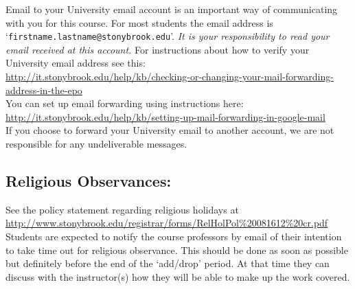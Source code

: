 \documentclass[11pt]{article}
\begin{document}
\noindent Email to your University email account is an important way
of communicating with you for this course.  For most students the
email address is `{\tt firstname.lastname@stonybrook.edu}'.
{\em It is your responsibility to read your email received at this
  account.}  For instructions about how to verify your University
email address see this: \\[0.25em]
\url{http://it.stonybrook.edu/help/kb/checking-or-changing-your-mail-forwarding-address-in-the-epo}
\\[0.25em]
%
You can set up email forwarding using instructions here: \\[0.25em]
\url{http://it.stonybrook.edu/help/kb/setting-up-mail-forwarding-in-google-mail}
\\[0.25em]
%
If you choose to forward your University email to another account, we
are not responsible for any undeliverable messages.

\subsection*{Religious Observances: }

\noindent See the policy statement regarding religious holidays at
\\[0.25em] {
  \url{http://www.stonybrook.edu/registrar/forms/RelHolPol\%20081612\%20cr.pdf}}
\\[0.25em]
%
Students are expected to notify the course professors by email of
their intention to take time out for religious observance.  This
should be done as soon as possible but definitely before the end of
the `add/drop' period.  At that time they can discuss with the
instructor(s) how they will be able to make up the work covered.
\end{document}
